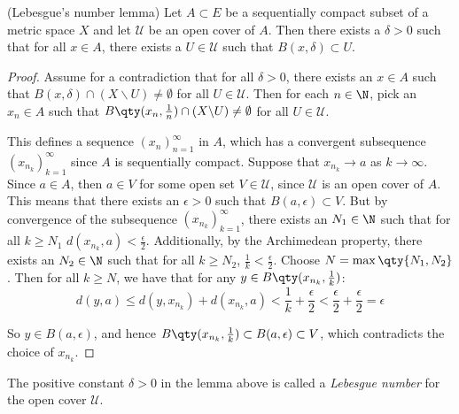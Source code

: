  \begin{lemma}
   (Lebesgue's number lemma) Let \( A\subset E \) be a sequentially compact subset of a metric space \( X \) and let \( \mathcal{U} \) be an open cover of \( A \). Then there exists a \( \delta>0 \) such that for all \( x\in A \), there exists a \( U\in\mathcal{U} \) such that \( B(x,\delta)\subset U \).
 \end{lemma}
 \begin{proof}
   Assume for a contradiction that for all \( \delta>0 \), there exists an \( x\in A \) such that \( B(x,\delta)\cap (X\backslash U)\neq\emptyset \) for all \( U\in\mathcal{U} \). Then for each \( n\in\N \), pick an \( x_n\in A \) such that \( B\qty(x_n,\frac{1}{n})\cap (X\backslash U)\neq\emptyset \) for all \( U\in\mathcal{U} \).

   \vspace{3mm}

   This defines a sequence \( (x_n)_{n=1}^\infty \) in \( A \), which has a convergent subsequence \( (x_{n_k})_{k=1}^\infty \) since \( A \) is sequentially compact. Suppose that \( x_{n_k}\to a \) as \( k\to\infty \). Since \( a\in A \), then \( a\in V \) for some open set \( V\in\mathcal{U} \), since \( \mathcal{U} \) is an open cover of \( A \). This means that there exists an \( \epsilon>0 \) such that \( B(a,\epsilon)\subset V \). But by convergence of the subsequence \( (x_{n_k})_{k=1}^\infty \), there exists an \( N_1\in\N \) such that for all \( k\geq N_1 \) \( d(x_{n_k},a)<\frac{\epsilon}{2} \). Additionally, by the Archimedean property, there exists an \( N_2\in\N \) such that for all \( k\geq N_2 \), \( \frac{1}{k}<\frac{\epsilon}{2} \). Choose \( N=\max\qty{N_1,N_2} \). Then for all \( k\geq N \), we have that for any \( y\in B\qty(x_{n_k},\frac{1}{k}) \):
   \[ d(y,a)\leq d(y,x_{n_k})+d(x_{n_k},a)<\frac{1}{k}+\frac{\epsilon}{2}<\frac{\epsilon}{2}+\frac{\epsilon}{2}=\epsilon \]

   So \( y\in B(a,\epsilon) \), and hence \( B\qty(x_{n_k},\frac{1}{k})\subset B(a,\epsilon)\subset V \), which contradicts the choice of \( x_{n_k} \).
 \end{proof}
 The positive constant \( \delta>0 \) in the lemma above is called a \emph{Lebesgue number} for the open cover \( \mathcal{U} \).

